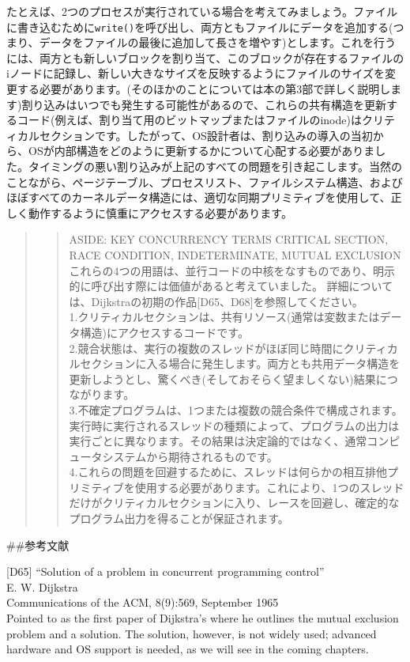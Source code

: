 たとえば、2つのプロセスが実行されている場合を考えてみましょう。ファイルに書き込むために\texttt{write()}を呼び出し、両方ともファイルにデータを追加する(つまり、データをファイルの最後に追加して長さを増やす)とします。これを行うには、両方とも新しいブロックを割り当て、このブロックが存在するファイルのiノードに記録し、新しい大きなサイズを反映するようにファイルのサイズを変更する必要があります。(そのほかのことについては本の第3部で詳しく説明します)割り込みはいつでも発生する可能性があるので、これらの共有構造を更新するコード(例えば、割り当て用のビットマップまたはファイルのinode)はクリティカルセクションです。したがって、OS設計者は、割り込みの導入の当初から、OSが内部構造をどのように更新するかについて心配する必要がありました。タイミングの悪い割り込みが上記のすべての問題を引き起こします。当然のことながら、ページテーブル、プロセスリスト、ファイルシステム構造、およびほぼすべてのカーネルデータ構造には、適切な同期プリミティブを使用して、正しく動作するように慎重にアクセスする必要があります。

\begin{quote}
\begin{quote}
ASIDE: KEY CONCURRENCY TERMS CRITICAL SECTION, RACE CONDITION,
INDETERMINATE, MUTUAL EXCLUSION\\
これらの4つの用語は、並行コードの中核をなすものであり、明示的に呼び出す際には価値があると考えていました。
詳細については、Dijkstraの初期の作品{[}D65、D68{]}を参照してください。\\
1.クリティカルセクションは、共有リソース(通常は変数またはデータ構造)にアクセスするコードです。\\
2.競合状態は、実行の複数のスレッドがほぼ同じ時間にクリティカルセクションに入る場合に発生します。両方とも共用データ構造を更新しようとし、驚くべき(そしておそらく望ましくない)結果につながります。\\
3.不確定プログラムは、1つまたは複数の競合条件で構成されます。実行時に実行されるスレッドの種類によって、プログラムの出力は実行ごとに異なります。その結果は決定論的ではなく、通常コンピュータシステムから期待されるものです。\\
4.これらの問題を回避するために、スレッドは何らかの相互排他プリミティブを使用する必要があります。これにより、1つのスレッドだけがクリティカルセクションに入り、レースを回避し、確定的なプログラム出力を得ることが保証されます。
\end{quote}
\end{quote}

\#\#参考文献

{[}D65{]} ``Solution of a problem in concurrent programming control''\\
E. W. Dijkstra\\
Communications of the ACM, 8(9):569, September 1965\\
Pointed to as the first paper of Dijkstra's where he outlines the mutual
exclusion problem and a solution. The solution, however, is not widely
used; advanced hardware and OS support is needed, as we will see in the
coming chapters.

